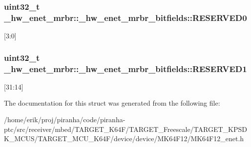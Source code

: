 \subsubsection[{\texorpdfstring{R\+E\+S\+E\+R\+V\+E\+D0}{RESERVED0}}]{\setlength{\rightskip}{0pt plus 5cm}uint32\+\_\+t \+\_\+hw\+\_\+enet\+\_\+mrbr\+::\+\_\+hw\+\_\+enet\+\_\+mrbr\+\_\+bitfields\+::\+R\+E\+S\+E\+R\+V\+E\+D0}\hypertarget{struct__hw__enet__mrbr_1_1__hw__enet__mrbr__bitfields_a52ea0ee0b5b36b0ab8bf46fbea3f3438}{}\label{struct__hw__enet__mrbr_1_1__hw__enet__mrbr__bitfields_a52ea0ee0b5b36b0ab8bf46fbea3f3438}
\mbox{[}3\+:0\mbox{]} 
\subsubsection[{\texorpdfstring{R\+E\+S\+E\+R\+V\+E\+D1}{RESERVED1}}]{\setlength{\rightskip}{0pt plus 5cm}uint32\+\_\+t \+\_\+hw\+\_\+enet\+\_\+mrbr\+::\+\_\+hw\+\_\+enet\+\_\+mrbr\+\_\+bitfields\+::\+R\+E\+S\+E\+R\+V\+E\+D1}\hypertarget{struct__hw__enet__mrbr_1_1__hw__enet__mrbr__bitfields_a7658a0a6285fcb271f2581fbd81184c0}{}\label{struct__hw__enet__mrbr_1_1__hw__enet__mrbr__bitfields_a7658a0a6285fcb271f2581fbd81184c0}
\mbox{[}31\+:14\mbox{]} 

The documentation for this struct was generated from the following file\+:\begin{DoxyCompactItemize}
\item 
/home/erik/proj/piranha/code/piranha-\/ptc/src/receiver/mbed/\+T\+A\+R\+G\+E\+T\+\_\+\+K64\+F/\+T\+A\+R\+G\+E\+T\+\_\+\+Freescale/\+T\+A\+R\+G\+E\+T\+\_\+\+K\+P\+S\+D\+K\+\_\+\+M\+C\+U\+S/\+T\+A\+R\+G\+E\+T\+\_\+\+M\+C\+U\+\_\+\+K64\+F/device/device/\+M\+K64\+F12/M\+K64\+F12\+\_\+enet.\+h\end{DoxyCompactItemize}
